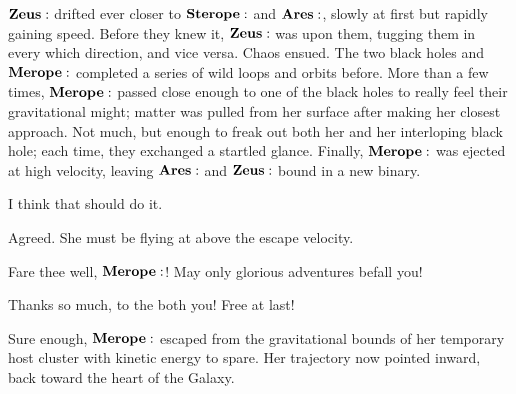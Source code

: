 $\Zeus$ drifted ever closer to $\Sterope$ and $\Ares$, slowly at first but rapidly gaining speed.  Before they knew it, $\Zeus$ was upon them, tugging them in every which direction, and vice versa.  Chaos ensued.  The two black holes and $\Merope$ completed a series of wild loops and orbits before.  More than a few times, $\Merope$ passed close enough to one of the black holes to really feel their gravitational might;  matter was pulled from her surface after making her closest approach. Not much, but enough to freak out both her and her interloping black hole; each time, they exchanged a startled glance.  Finally, $\Merope$ was ejected at high velocity, leaving $\Ares$ and $\Zeus$ bound in a new binary.    

\Ares I think that should do it.  

\Zeus Agreed.  She must be flying at above the escape velocity.  

\Ares Fare thee well, $\Merope$!  May only glorious adventures befall you!

\Merope Thanks so much, to the both you!  Free at last!

Sure enough, $\Merope$ escaped from the gravitational bounds of her temporary host cluster with kinetic energy to spare.  Her trajectory now pointed inward, back toward the heart of the Galaxy.








